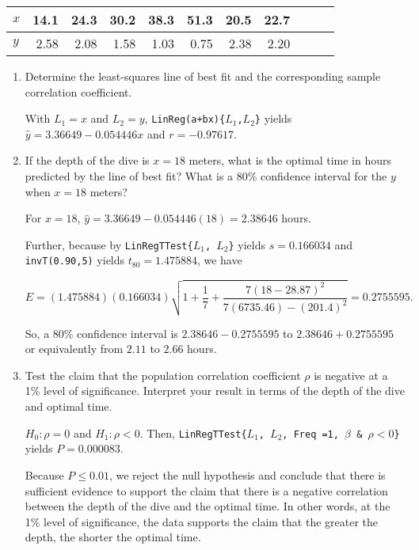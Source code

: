 \documentclass[10pt]{article}
\begin{document}
\begin{enumerate}
\begin{tabular}{l||rrrrrrrrrr}
\hline
$x$  & 14.1 & 24.3 & 30.2 & 38.3 & 51.3 & 20.5 & 22.7 \\
\hline
$y$ & 2.58 & 2.08 & 1.58 & 1.03 & 0.75 & 2.38 & 2.20 \\
\hline
\end{tabular}


	\begin{enumerate}
	\item Determine the least-squares line of best fit and the corresponding sample correlation coefficient. 
	
	{\answer With $L_1 = x$ and $L_2 = y$, \texttt{LinReg(a+bx)\{$L_1$,$L_2$\}} yields $\hat{y}=3.36649 -0.054446x$ and $r=-0.97617$.} 
	
	\item If the depth of the dive is $x=18$ meters, what is the optimal time in hours predicted by the line of best fit? What is a 80\% confidence interval for the $y$ when $x=18$ meters? 
	
	{\answer For $x=18$, $\hat{y} = 3.36649-0.054446(18) = 2.38646$ hours. 
	
	Further, because by \texttt{LinRegTTest\{$L_1$, $L_2$\}} yields $s = 0.166034$ and \texttt{invT(0.90,5)} yields $t_{80} = 1.475884$, we have 
	
	$$E = (1.475884)(0.166034)\sqrt{1 + \frac{1}{7}+\frac{7(18 - 28.87)^2}{7(6735.46)-(201.4)^2}} =0.2755595.$$
	
	So, a 80\% confidence interval is $2.38646 - 0.2755595$ to $2.38646 + 0.2755595$ or equivalently from $2.11$ to $2.66$ hours.} 
	
	\item Test the claim that the population correlation coefficient $\rho$ is negative at a 1\% level of significance.  Interpret your result in terms of the depth of the dive and optimal time. 
	
	{\answer $H_0: \rho=0$ and $H_1: \rho <0$.  Then, \texttt{LinRegTTest\{$L_1$, $L_2$, Freq =1, $\beta$ \& $\rho < 0$\}} yields $P = 0.000083$. 
	
	Because $P \leq 0.01$, we reject the null hypothesis and conclude that there is sufficient evidence to support the claim that there is a negative correlation between the depth of the dive and the optimal time.  In other words, at the 1\% level of significance, the data supports the claim that the greater the depth, the shorter the optimal time.} 
	

\end{enumerate}
\end{enumerate}
\end{document}
